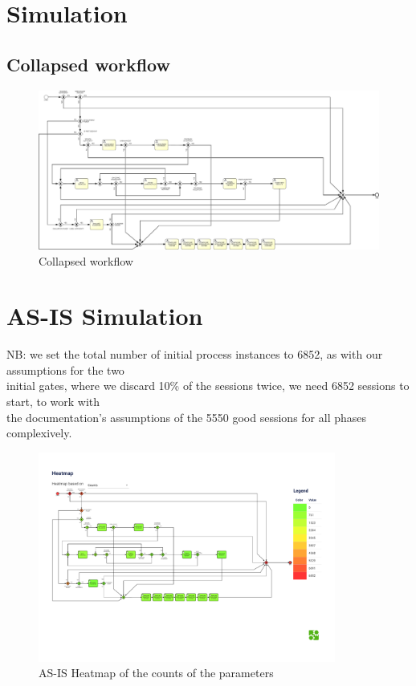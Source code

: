 \section{Simulation}
\label{sec:simulation}

\subsection{Collapsed workflow}

\begin{figure}[H]
\centering
\includegraphics[width=1\textwidth]{figures/Collapsed Workflow SIM.pdf}
\caption{Collapsed workflow}
\label{fig:collapsed_workflow}
\end{figure}

\section{AS-IS Simulation}
\label{sec:as_is_simulation}

NB: we set the total number of initial process instances to 6852,
as with our assumptions for the two \\ 
initial gates, where we discard 10\% of the sessions twice, we need 6852 sessions to start, to work with  \\ 
the documentation's assumptions of the 5550 good sessions for all phases complexively. \\

\begin{figure}[H]
    \centering
    \includegraphics[width=0.87\textwidth]{figures/AS-IS heatmap_counts.pdf}
    \caption{AS-IS Heatmap of the counts of the parameters}
    \label{fig:as_is_heatmap_counts}
\end{figure}

